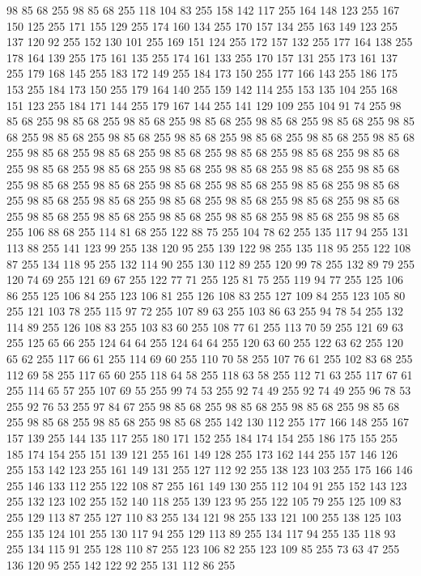 98 85 68 255 98 85 68 255 118 104 83 255 158 142 117 255 164 148 123 255 167 150 125 255 171 155 129 255 174 160 134 255 170 157 134 255 163 149 123 255 137 120 92 255 152 130 101 255 169 151 124 255 172 157 132 255 177 164 138 255 178 164 139 255 175 161 135 255 174 161 133 255 170 157 131 255 173 161 137 255 179 168 145 255 183 172 149 255 184 173 150 255 177 166 143 255 186 175 153 255 184 173 150 255 179 164 140 255 159 142 114 255 153 135 104 255 168 151 123 255 184 171 144 255 179 167 144 255 141 129 109 255 104 91 74 255 98 85 68 255 98 85 68 255 98 85 68 255 98 85 68 255 98 85 68 255 98 85 68 255 98 85 68 255 98 85 68 255 98 85 68 255 98 85 68 255 98 85 68 255 98 85 68 255 98 85 68 255 98 85 68 255 98 85 68 255 98 85 68 255 98 85 68 255 98 85 68 255 98 85 68 255 98 85 68 255 98 85 68 255 98 85 68 255 98 85 68 255 98 85 68 255 98 85 68 255 98 85 68 255 98 85 68 255 98 85 68 255 98 85 68 255 98 85 68 255
98 85 68 255 98 85 68 255 98 85 68 255 98 85 68 255 98 85 68 255 98 85 68 255 98 85 68 255 98 85 68 255 98 85 68 255 98 85 68 255 98 85 68 255 98 85 68 255 98 85 68 255 106 88 68 255 114 81 68 255 122 88 75 255 104 78 62 255 135 117 94 255 131 113 88 255 141 123 99 255 138 120 95 255 139 122 98 255 135 118 95 255 122 108 87 255 134 118 95 255 132 114 90 255 130 112 89 255 120 99 78 255 132 89 79 255 120 74 69 255 121 69 67 255 122 77 71 255 125 81 75 255 119 94 77 255 125 106 86 255 125 106 84 255 123 106 81 255 126 108 83 255 127 109 84 255 123 105 80 255 121 103 78 255 115 97 72 255 107 89 63 255 103 86 63 255 94 78 54 255 132 114 89 255 126 108 83 255 103 83 60 255 108 77 61 255 113 70 59 255 121 69 63 255 125 65 66 255 124 64 64 255 124 64 64 255 120 63 60 255 122 63 62 255 120 65 62 255 117 66 61 255 114 69 60 255 110 70 58 255 107 76 61 255 102 83 68 255 112 69 58 255 117 65 60 255
118 64 58 255 118 63 58 255 112 71 63 255 117 67 61 255 114 65 57 255 107 69 55 255 99 74 53 255 92 74 49 255 92 74 49 255 96 78 53 255 92 76 53 255 97 84 67 255 98 85 68 255 98 85 68 255 98 85 68 255 98 85 68 255 98 85 68 255 98 85 68 255 98 85 68 255 142 130 112 255 177 166 148 255 167 157 139 255 144 135 117 255 180 171 152 255 184 174 154 255 186 175 155 255 185 174 154 255 151 139 121 255 161 149 128 255 173 162 144 255 157 146 126 255 153 142 123 255 161 149 131 255 127 112 92 255 138 123 103 255 175 166 146 255 146 133 112 255 122 108 87 255 161 149 130 255 112 104 91 255 152 143 123 255 132 123 102 255 152 140 118 255 139 123 95 255 122 105 79 255 125 109 83 255 129 113 87 255 127 110 83 255 134 121 98 255 133 121 100 255 138 125 103 255 135 124 101 255 130 117 94 255 129 113 89 255 134 117 94 255 135 118 93 255 134 115 91 255 128 110 87 255 123 106 82 255 123 109 85 255 73 63 47 255 136 120 95 255 142 122 92 255 131 112 86 255
